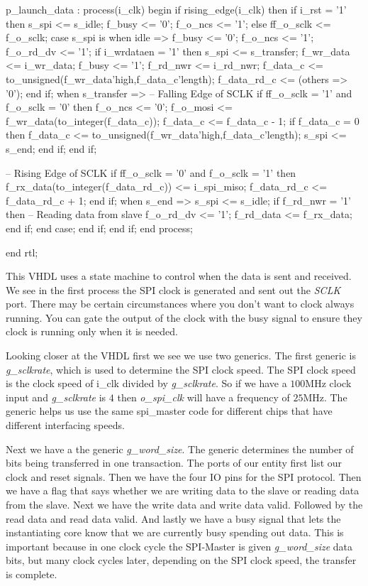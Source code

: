 \begin{VHDLlisting}[tabsize=4]
	p_launch_data : process(i_clk)
	begin
		if rising_edge(i_clk) then
			if i_rst = '1' then
				s_spi <= s_idle;
				f_busy <= '0';
				f_o_ncs <= '1';
			else
				ff_o_sclk <= f_o_sclk;
				case s_spi is
					when idle =>
						f_busy <= '0';
						f_o_ncs <= '1';
						f_o_rd_dv <= '1';
						if i_wrdataen = '1' then
							s_spi <= s_transfer;
							f_wr_data <= i_wr_data;
							f_busy <= '1';
							f_rd_nwr <= i_rd_nwr;
							f_data_c <= to_unsigned(f_wr_data'high,f_data_c'length);
							f_data_rd_c <= (others => '0');
						end if;
					when s_transfer => 
						-- Falling Edge of SCLK
						if ff_o_sclk = '1' and f_o_sclk = '0' then
							f_o_ncs <= '0';
							f_o_mosi <= f_wr_data(to_integer(f_data_c));
							f_data_c <= f_data_c - 1;
							if f_data_c = 0 then
								f_data_c <= to_unsigned(f_wr_data'high,f_data_c'length);
								s_spi <= s_end;
							end if;
						end if;					

						-- Rising Edge of SCLK
						if ff_o_sclk = '0' and f_o_sclk = '1' then
							f_rx_data(to_integer(f_data_rd_c)) <= i_spi_miso;
							f_data_rd_c <= f_data_rd_c + 1;
						end if;
					when s_end => 
						s_spi <= s_idle;
						if f_rd_nwr = '1' then
							-- Reading data from slave
							f_o_rd_dv <= '1';
							f_rd_data <= f_rx_data;
						end if;				
				end case;
			end if;
		end if;	
	end process;


end rtl;
\end{VHDLlisting}

This \ac{VHDL} uses a state machine to control when the data is sent and received. We see in the first process the \ac{SPI} clock is generated and sent out the \emph{SCLK} port. There may be certain circumstances where you don't want to clock always running. You can gate the output of the clock with the busy signal to ensure they clock is running only when it is needed. 

Looking closer at the \ac{VHDL} first we see we use two generics. The first generic is \emph{g\_sclkrate}, which is used to determine the \ac{SPI} clock speed. The \ac{SPI} clock speed is the clock speed of i\_clk divided by \emph{g\_sclkrate}. So if we have a $100$\ac{MHz} clock input and \emph{g\_sclkrate} is $4$ then \emph{o\_spi\_clk} will have a frequency of $25$\ac{MHz}. The generic helps us use the same spi\_master code for different chips that have different interfacing speeds. 

Next we have a the generic \emph{g\_word\_size}. The generic determines the number of bits being transferred in one transaction. The ports of our entity first list our clock and reset signals. Then we have the four \ac{IO} pins for the \ac{SPI} protocol. Then we have a flag that says whether we are writing data to the slave or reading data from the slave. Next we have the write data and write data valid. Followed by the read data and read data valid. And lastly we have a busy signal that lets the instantiating core know that we are currently busy spending out data. This is important because in one clock cycle the \ac{SPI}-Master is given \emph{g\_word\_size} data bits, but many clock cycles later, depending on the \ac{SPI} clock speed, the transfer is complete. 

